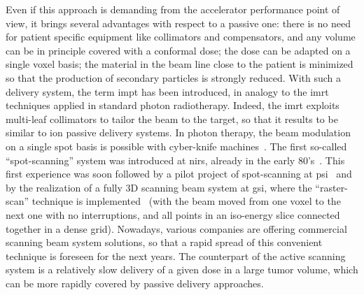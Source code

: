 Even if this approach is demanding from the accelerator performance point of view, it brings several advantages with respect to a passive one: there is no need for patient specific equipment like collimators and compensators, and any volume can be in principle covered with a conformal dose; the dose can be adapted on a single voxel basis; the material in the beam line close to the patient is minimized so that the production of secondary particles is strongly reduced. 
With such a delivery system, the term \gls{impt} has been introduced, in analogy to the \gls{imrt} techniques applied in standard photon radiotherapy. Indeed, the \gls{imrt} exploits multi-leaf collimators to tailor the beam to the target, so that it results to be similar to ion passive delivery systems. In photon therapy, the beam modulation on a single spot basis is possible with cyber-knife machines~\parencite{Srivastava2015}.   
The first so-called \enquote{spot-scanning} system was introduced at \gls{nirs}, already in the early 80's~\parencite{Kanai1983}. This first experience was soon followed by a pilot project of spot-scanning at \gls{psi}~\parencite{Pedroni1995} and by the realization of a fully 3D scanning beam system at \gls{gsi}, where the \enquote{raster-scan} technique is implemented~\parencite{Haberer1993} (with the beam moved from one voxel to the next one with no interruptions, and all points in an iso-energy slice connected together in a dense grid). 
Nowadays, various companies are offering commercial scanning beam system solutions, so that a rapid spread of this convenient technique is foreseen for the next years. The counterpart of the active scanning system is a relatively slow delivery of a given dose in a large tumor volume, which can be more rapidly covered by passive delivery approaches.  
 
